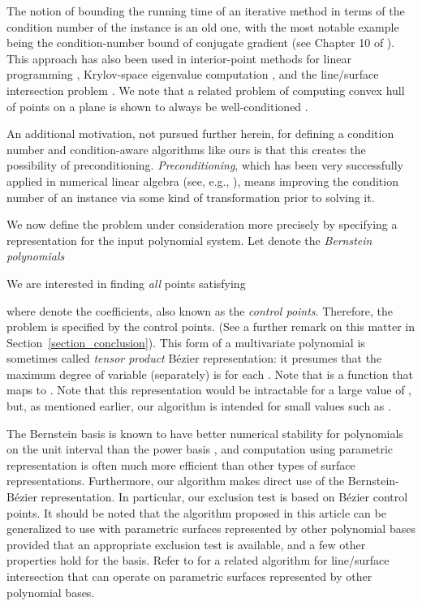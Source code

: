 \documentclass{article}
\begin{document}
The notion of bounding the running time of an iterative method in
terms of the condition number of the instance is an old one, with
the most notable example being the condition-number bound of
conjugate gradient (see Chapter 10 of \cite{gvl}). This approach
has also been used in interior-point methods for linear
programming \cite{freund}, Krylov-space eigenvalue computation
\cite{toh}, and the line/surface intersection problem
\cite{srijuntongsiri_lsi}.  We note that a related problem of computing convex hull of points on a plane is shown to always be well-conditioned \cite{jiang}.

An additional motivation, not pursued further herein, for defining a
condition number and condition-aware algorithms like ours is that this
creates the possibility of preconditioning.  {\em Preconditioning},
which has been very successfully applied in numerical linear algebra
(see, e.g., \cite{TrefethenBau}), means improving the condition number
of an instance via some kind of transformation prior to solving it.

We now define the problem under consideration more precisely by
specifying a representation for the input polynomial system.
Let  denote the \emph{Bernstein polynomials}

We are interested in finding \emph{all} points  satisfying

where   denote the coefficients, also known as the \emph{control points}.  Therefore, the
problem is specified by the  control points.  
(See a further remark on this matter in Section~\ref{section_conclusion}).
This form of a multivariate polynomial is sometimes called {\em tensor product} B\'ezier
representation: it presumes 
that the maximum degree of variable  (separately) is 
for each .  
Note that  is a function that maps  to .  
Note that this representation would be intractable
for a large value of , but, as mentioned earlier, our algorithm is
intended for small values such as .

The Bernstein basis is known to 
have better numerical stability for polynomials on the unit interval
than the power basis \cite{farouki_rajan, farouki_stable_bernstein},  
and computation using parametric representation is often
much more efficient than other types of surface representations.  
Furthermore,
our algorithm makes direct use of the Bernstein-B\'ezier representation.
In particular, our exclusion test is based
on B\'ezier control points.  It
should be noted that the algorithm proposed in this article can be
generalized to use with parametric surfaces represented by other
polynomial bases provided that an appropriate exclusion test is
available, and a few other properties hold for the basis.  Refer to
\cite{srijuntongsiri_lsi} for a related algorithm for line/surface
intersection that can operate on parametric surfaces represented by
other polynomial bases.
\end{document}
